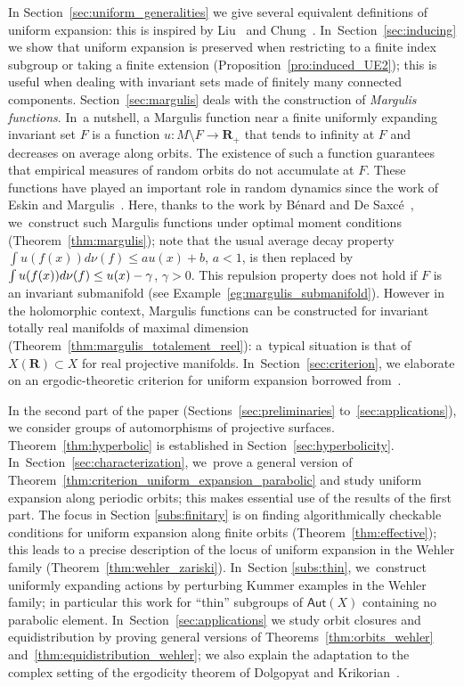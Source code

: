 \documentclass[11pt]{article}
\def\R{\mathbf{R}}
\newcommand\Aut{\mathsf{Aut}}
\theoremstyle{plain}
\theoremstyle{definition}
\numberwithin{equation}{section}
\begin{document}
In Section~\ref{sec:uniform_generalities} we give several equivalent definitions of uniform expansion:
this is inspired by Liu~\cite{liu_thesis} and Chung~\cite{chung}. In~Section~\ref{sec:inducing} we show that uniform expansion is preserved
when restricting to a finite index
subgroup or taking a finite extension (Proposition~\ref{pro:induced_UE2}); this
is useful when dealing with invariant sets made of finitely many connected components. Section~\ref{sec:margulis} deals with the construction of
\emph{Margulis functions}. In~a nutshell, a Margulis function
near a finite uniformly expanding invariant set $F$ is a function
$u:M\setminus F\to \R_+$ that tends to infinity at $F$ and decreases on average along orbits.
The existence of such a function
guarantees that empirical measures of random orbits do not accumulate at $F$. These functions have played an
important role in random dynamics since the work of Eskin and Margulis~\cite{eskin-margulis}.
Here, thanks to the work by Bénard and De Saxcé~\cite{benard-desaxce}, we~construct such Margulis functions under optimal moment conditions (Theorem~\ref{thm:margulis});
note that the usual average
decay property $\int u (f(x)) d\nu(f) \leq a u(x)+b$, $a<1$, is then replaced by $\int u (f(x)) d\nu(f) \leq u(x) -\nobreak \gamma$, $\gamma>0$. This repulsion property does not hold if $F$ is an invariant submanifold (see Example~\ref{eg:margulis_submanifold}). However in the holomorphic context, Margulis functions
can be constructed for invariant
totally real manifolds of maximal dimension (Theorem~\ref{thm:margulis_totalement_reel}): a~typical situation
is that of $X(\R)\subset X$ for real projective manifolds. In~Section~\ref{sec:criterion}, we elaborate on an ergodic-theoretic criterion for uniform expansion borrowed
from~\cite{chung}.

In the second part of the paper (Sections~\ref{sec:preliminaries} to~\ref{sec:applications}), we
consider groups of automorphisms of projective surfaces. Theorem~\ref{thm:hyperbolic}
is established in Section~\ref{sec:hyperbolicity}. In~Section~\ref{sec:characterization}, we~prove a general version of
Theorem~\ref{thm:criterion_uniform_expansion_parabolic} and
study uniform expansion along periodic orbits; this makes essential use of the results of the first part.
The focus in Section \ref{subs:finitary} is on finding
algorithmically checkable conditions for uniform expansion along finite orbits (Theorem~\ref{thm:effective});
this leads to a precise description of the locus of uniform expansion in the Wehler family (Theorem~\ref{thm:wehler_zariski}). In~Section \ref{subs:thin}, we~construct uniformly expanding actions by perturbing Kummer examples in the Wehler family;
in particular this work for ``thin'' subgroups of $\Aut(X)$ containing no parabolic element. In~Section~\ref{sec:applications} we study orbit closures and equidistribution by proving
general versions of Theorems~\ref{thm:orbits_wehler} and~\ref{thm:equidistribution_wehler};
we also explain the adaptation to the complex setting of the ergodicity
theorem of Dolgopyat and Krikorian~\cite{dolgopyat-krikorian}.
\end{document}
